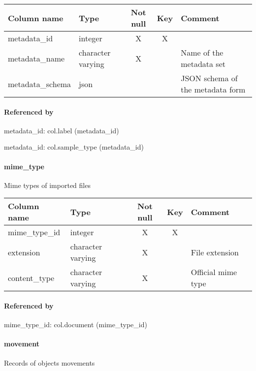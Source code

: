 \begin{tabular}{|l| p{2cm}|c|c| p{5cm}|}
\hline
Column name & Type & Not null & Key & Comment \\
\hline
metadata\_id & integer & X & X & \\
metadata\_name & character varying & X &  & Name of the metadata set\\
metadata\_schema & json &  &  & JSON schema of the metadata form\\
\hline
\end{tabular}
\paragraph{Referenced by}
metadata\_id: col.label (metadata\_id)

metadata\_id: col.sample\_type (metadata\_id)

\paragraph{mime\_type}
Mime types of imported files

\begin{tabular}{|l| p{2cm}|c|c| p{5cm}|}
\hline
Column name & Type & Not null & Key & Comment \\
\hline
mime\_type\_id & integer & X & X & \\
extension & character varying & X &  & File extension\\
content\_type & character varying & X &  & Official mime type\\
\hline
\end{tabular}
\paragraph{Referenced by}
mime\_type\_id: col.document (mime\_type\_id)

\paragraph{movement}
Records of objects movements


